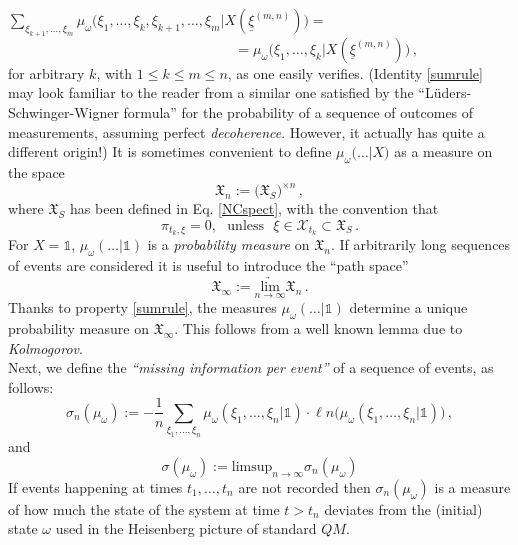 \documentclass[a4paper,11pt]{article}
\begin{document}
\quad $\underset{\xi_{k+1},\dots, \xi_{m}}{\sum} \mu_{\omega} \big(\xi_1,\dots, \xi_{k}, \xi_{k+1}, \dots, \xi_{m}\vert X(\underline{\xi}^{(m,n)})\big) = $
\begin{equation}\label{sumrule}
\hspace{4cm} = \mu_{\omega}(\xi_1, \dots, \xi_{k} \vert X(\underline{\xi}^{(m,n)})\big)\,,
\end{equation}
for arbitrary $k$, with $1\leq k \leq m\leq n$, as one easily verifies. (Identity \eqref{sumrule} may look familiar to the reader from a similar one satisfied by the ``L\"{u}ders-Schwinger-Wigner formula'' \cite{Schwinger} for the probability of a sequence of outcomes of measurements, assuming perfect \textit{decoherence}. However, it actually has quite a different origin!) It is sometimes convenient to define $\mu_{\omega}\big(\dots \vert X\big)$ as a measure on the space
$$\mathfrak{X}_{n}:= \big(\mathfrak{X}_{S}\big)^{\times n}\,,$$
where $\mathfrak{X}_{S}$ has been defined in Eq. \eqref{NCspect}, with the convention that 
$$\pi_{t_{k}, \xi}=0, \,\,\text{  unless  }\,\, \xi \in \mathcal{X}_{t_k} \subset \mathfrak{X}_{S}\,.$$
For $X ={\mathds{1}}$, $\mu_{\omega}(\dots\vert {\mathds{1}})$ is a \textit{probability measure} on $\mathfrak{X}_{n}$. If arbitrarily long sequences of events are considered it is useful to introduce the ``path space''
$$\mathfrak{X}_{\infty}:=\underset{n \rightarrow \infty}{\underrightarrow{\text{lim}}} \mathfrak{X}_{n}\,.$$
Thanks to property \eqref{sumrule}, the measures $\mu_{\omega}(\dots \vert {\mathds{1}})$ determine a unique probability measure on $\mathfrak{X}_{\infty}$. This follows from a well known lemma due to \textit{Kolmogorov}.\\
Next, we define the \textit{``missing information per event''} of a sequence of events, as follows:
$$\sigma_{n}(\mu_{\omega}):= - \frac{1}{n}\sum_{\xi_1, \dots, \xi_n} \mu_{\omega}(\xi_1, \dots, \xi_n\vert {\mathds{1}}) 
\cdot \ell n\big(\mu_{\omega}(\xi_1, \dots, \xi_n \vert {\mathds{1}})\big)\,, $$
and 
\begin{equation}\label{spec-entropy}
\sigma(\mu_{\omega}):= \text{limsup}_{n\rightarrow \infty} \sigma_{n}(\mu_{\omega})
\end{equation}
If events happening at times $t_1,\dots, t_n$ are not recorded then $\sigma_{n}(\mu_{\omega})$ is a measure of how much the state of the system at time $t>t_n$ deviates from the (initial) state $\omega$ used in the Heisenberg picture of standard $QM$.
\end{document}
